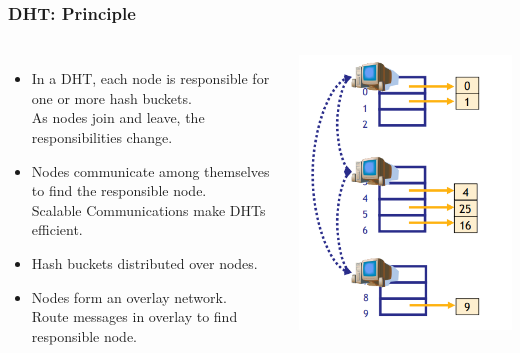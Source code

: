 \begin{frame}
    \frametitle{DHT: Principle}
    \begin{columns}
        \begin{itemize}
            \item In a DHT, each node is responsible for one or more hash buckets. \\
                As nodes join and leave, the responsibilities change.
            \item Nodes communicate among themselves to find the responsible node. \\
                Scalable Communications make DHTs efficient.
            \item Hash buckets distributed over nodes.
            \item Nodes form an \alert{overlay network}. \\
                Route messages in overlay to find responsible node.
        \end{itemize}
            \includegraphics[scale=0.3]{figures/dht_principle.png}
    \end{columns}
\end{frame}

